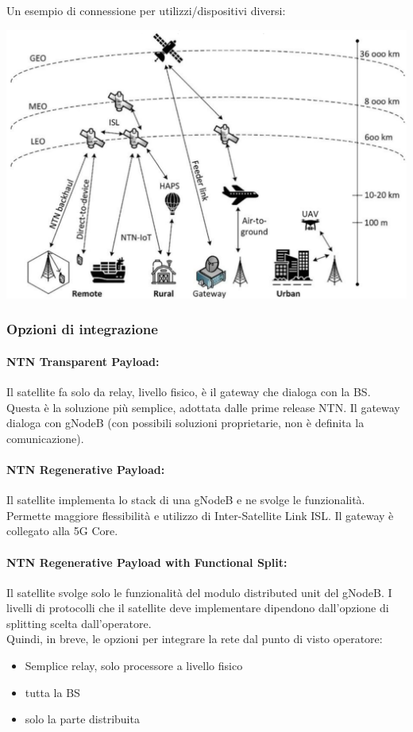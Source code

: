Un esempio di connessione per utilizzi/dispositivi diversi:
\begin{center}
	\includegraphics[width=0.75\linewidth]{img/sat/overview}
\end{center}

\subsubsection{Opzioni di integrazione}

\paragraph{NTN Transparent Payload:} Il satellite fa solo da relay, livello fisico, è il gateway che dialoga con la BS. Questa è la soluzione più semplice, adottata dalle prime release NTN. Il gateway dialoga con gNodeB (con possibili soluzioni proprietarie, non è definita la comunicazione).

\paragraph{NTN Regenerative Payload:} Il satellite implementa lo stack di una gNodeB e ne svolge le funzionalità. Permette maggiore flessibilità e utilizzo di Inter-Satellite Link ISL. Il gateway è collegato alla 5G Core. 

\paragraph{NTN Regenerative Payload with Functional Split:} Il satellite svolge solo le funzionalità del modulo distributed unit del gNodeB. I livelli di protocolli che il satellite deve implementare dipendono dall'opzione di splitting scelta dall'operatore.\\

Quindi, in breve, le opzioni per integrare la rete dal punto di visto operatore:
\begin{itemize}
	\item Semplice relay, solo processore a livello fisico
	\item tutta la BS
	\item solo la parte distribuita
\end{itemize}

